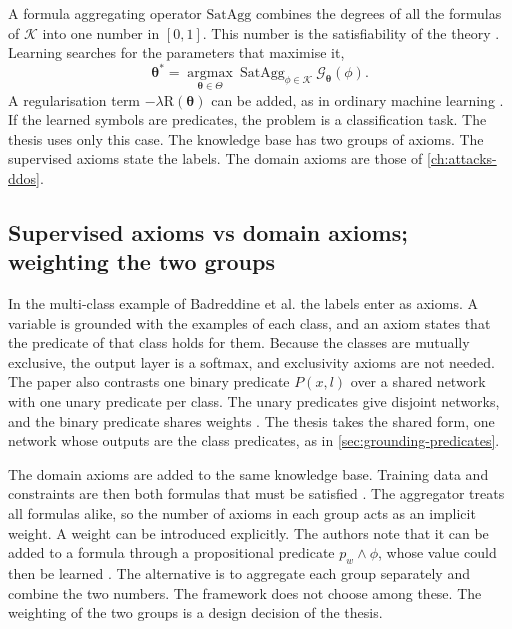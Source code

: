 A formula aggregating operator $\mathrm{SatAgg}$ combines the degrees of all the
formulas of $\mathcal{K}$ into one number in $[0,1]$. This number is the
satisfiability of the theory \citep{badreddine2022ltn}. Learning searches for
the parameters that maximise it,
\[
\boldsymbol{\theta}^{*}=\operatorname*{argmax}_{\boldsymbol{\theta}\in\Theta}
\ \mathrm{SatAgg}_{\phi\in\mathcal{K}}\ \mathcal{G}_{\boldsymbol{\theta}}(\phi).
\]
A regularisation term $-\lambda\mathrm{R}(\boldsymbol{\theta})$ can be added,
as in ordinary machine learning \citep{badreddine2022ltn}. If the learned
symbols are predicates, the problem is a classification task. The thesis uses
only this case. The knowledge base has two groups of axioms. The supervised
axioms state the labels. The domain axioms are those of
\cref{ch:attacks-ddos}.

\subsection{Supervised axioms vs domain axioms; weighting the two groups}
\label{sec:supervised-domain-axioms}

In the multi-class example of Badreddine et al. the labels enter as axioms. A
variable is grounded with the examples of each class, and an axiom states that
the predicate of that class holds for them. Because the classes are mutually
exclusive, the output layer is a softmax, and exclusivity axioms are not
needed. The paper also contrasts one binary predicate $P(x,l)$ over a shared
network with one unary predicate per class. The unary predicates give disjoint
networks, and the binary predicate shares weights
\citep{badreddine2022ltn}. The thesis takes the shared form, one network whose
outputs are the class predicates, as in \cref{sec:grounding-predicates}.

The domain axioms are added to the same knowledge base. Training data and
constraints are then both formulas that must be satisfied
\citep{badreddine2022ltn}. The aggregator treats all formulas alike, so the
number of axioms in each group acts as an implicit weight. A weight can be
introduced explicitly. The authors note that it can be added to a formula
through a propositional predicate $p_w\wedge\phi$, whose value could then be
learned \citep{badreddine2022ltn}. The alternative is to aggregate each group
separately and combine the two numbers. The framework does not choose among
these. The weighting of the two groups is a design decision of the thesis.

